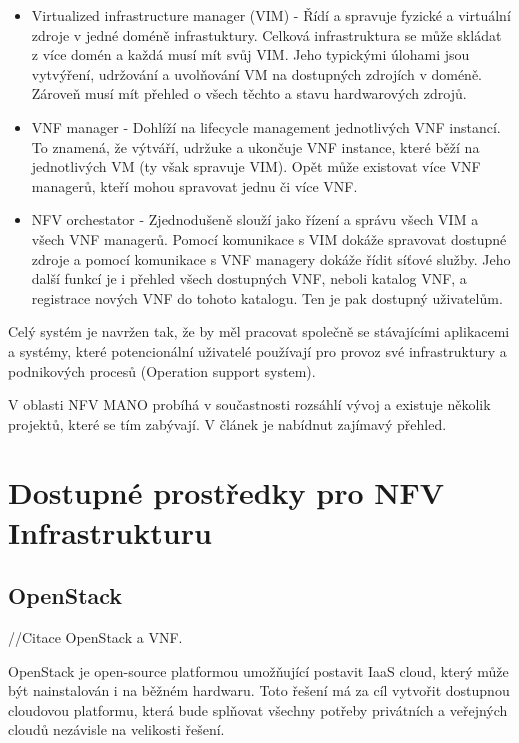 \begin{itemize}

\item Virtualized infrastructure manager (VIM) - Řídí a spravuje fyzické a virtuální zdroje v jedné doméně infrastuktury. Celková infrastruktura se může skládat z více domén a každá musí mít svůj VIM. Jeho typickými úlohami jsou vytvýření, udržování a uvolňování VM na dostupných zdrojích v doméně. Zároveň musí mít přehled o všech těchto a stavu hardwarových zdrojů.

\item VNF manager - Dohlíží na lifecycle management jednotlivých VNF instancí. To znamená, že výtváří, udržuke a ukončuje VNF instance, které běží na jednotlivých VM (ty však spravuje VIM). Opět může existovat více VNF managerů, kteří mohou spravovat jednu či více VNF.

\item NFV orchestator - Zjednodušeně slouží jako řízení a správu všech VIM a všech VNF managerů. Pomocí komunikace s VIM dokáže spravovat dostupné zdroje a pomocí komunikace s VNF managery dokáže řídit síťové služby. Jeho další funkcí je i přehled všech dostupných VNF, neboli katalog VNF, a registrace nových VNF do tohoto katalogu. Ten je pak dostupný uživatelům.
\end{itemize}

Celý systém je navržen tak, že by měl pracovat společně se stávajícími aplikacemi a systémy, které potencionální uživatelé používají pro provoz své infrastruktury a podnikových procesů (Operation support system).

V oblasti NFV MANO probíhá v součastnosti rozsáhlí vývoj a existuje několik projektů, které se tím zabývají. V článek \cite{NFV_orchestration} je nabídnut zajímavý přehled.


\section{Dostupné prostředky pro NFV Infrastrukturu}

\subsection{OpenStack}

//Citace OpenStack a VNF.

OpenStack je open-source platformou umožňující postavit IaaS cloud, který může být nainstalován i na běžném hardwaru. Toto řešení má za cíl vytvořit dostupnou cloudovou platformu, která bude splňovat všechny potřeby privátních a veřejných cloudů nezávisle na velikosti řešení. \cite{OpenStack}

